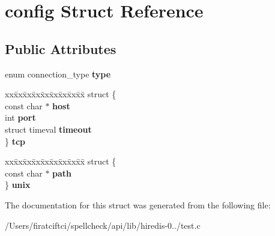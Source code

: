 \hypertarget{structconfig}{}\section{config Struct Reference}
\label{structconfig}
\subsection*{Public Attributes}
\begin{DoxyCompactItemize}
\item 
\mbox{\label{structconfig_ac1a4369bee218f0b8bee7d9d3c35e0ca}} 
enum connection\+\_\+type {\bfseries type}
\item 
\mbox{\label{structconfig_a12dd2ad802175c54411ee3e02832f27f}} 
\begin{tabbing}
xx\=xx\=xx\=xx\=xx\=xx\=xx\=xx\=xx\=\kill
struct \{\\
\>const char $\ast$ {\bfseries host}\\
\>int {\bfseries port}\\
\>struct timeval {\bfseries timeout}\\
\} {\bfseries tcp}\\

\end{tabbing}\item 
\mbox{\label{structconfig_a9d30f10a9246c20451418e5756926bdb}} 
\begin{tabbing}
xx\=xx\=xx\=xx\=xx\=xx\=xx\=xx\=xx\=\kill
struct \{\\
\>const char $\ast$ {\bfseries path}\\
\} {\bfseries unix}\\

\end{tabbing}\end{DoxyCompactItemize}


The documentation for this struct was generated from the following file\+:\begin{DoxyCompactItemize}
\item 
/\+Users/firatciftci/spellcheck/api/lib/hiredis-\/0../test.\+c\end{DoxyCompactItemize}
